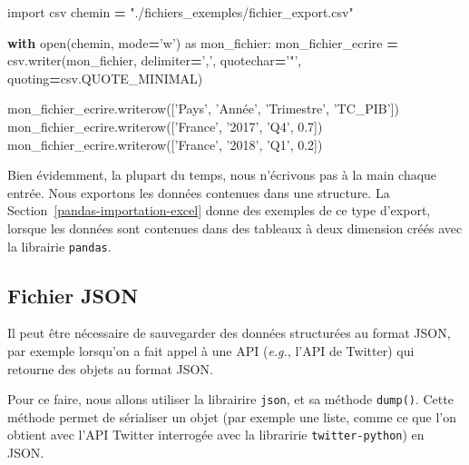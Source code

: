\documentclass[12pt,]{book}
\newenvironment{Shaded}{\begin{snugshade}}{\end{snugshade}}
\newcommand{\FloatTok}[1]{\textcolor[rgb]{0.00,0.00,0.81}{#1}}
\newcommand{\StringTok}[1]{\textcolor[rgb]{0.31,0.60,0.02}{#1}}
\newcommand{\ImportTok}[1]{#1}
\newcommand{\ControlFlowTok}[1]{\textcolor[rgb]{0.13,0.29,0.53}{\textbf{#1}}}
\newcommand{\OperatorTok}[1]{\textcolor[rgb]{0.81,0.36,0.00}{\textbf{#1}}}
\newcommand{\BuiltInTok}[1]{#1}
\newcommand{\NormalTok}[1]{#1}
\numberwithin{equation}{section}
\numberwithin{countremarque}{section}
\begin{document}
\begin{Shaded}
\begin{Highlighting}[]
\ImportTok{import}\NormalTok{ csv}
\NormalTok{chemin }\OperatorTok{=} \StringTok{"./fichiers_exemples/fichier_export.csv"}

\ControlFlowTok{with} \BuiltInTok{open}\NormalTok{(chemin, mode}\OperatorTok{=}\StringTok{'w'}\NormalTok{) }\ImportTok{as}\NormalTok{ mon_fichier:}
\NormalTok{    mon_fichier_ecrire }\OperatorTok{=}\NormalTok{ csv.writer(mon_fichier, delimiter}\OperatorTok{=}\StringTok{','}\NormalTok{,}
\NormalTok{                                    quotechar}\OperatorTok{=}\StringTok{'"'}\NormalTok{,}
\NormalTok{                                    quoting}\OperatorTok{=}\NormalTok{csv.QUOTE_MINIMAL)}

\NormalTok{    mon_fichier_ecrire.writerow([}\StringTok{'Pays'}\NormalTok{, }\StringTok{'Année'}\NormalTok{, }\StringTok{'Trimestre'}\NormalTok{, }\StringTok{'TC_PIB'}\NormalTok{])}
\NormalTok{    mon_fichier_ecrire.writerow([}\StringTok{'France'}\NormalTok{, }\StringTok{'2017'}\NormalTok{, }\StringTok{'Q4'}\NormalTok{, }\FloatTok{0.7}\NormalTok{])}
\NormalTok{    mon_fichier_ecrire.writerow([}\StringTok{'France'}\NormalTok{, }\StringTok{'2018'}\NormalTok{, }\StringTok{'Q1'}\NormalTok{, }\FloatTok{0.2}\NormalTok{])}
\end{Highlighting}
\end{Shaded}

Bien évidemment, la plupart du temps, nous n'écrivons pas à la main
chaque entrée. Nous exportons les données contenues dans une structure.
La Section~\ref{pandas-importation-excel} donne des exemples de ce type
d'export, lorsque les données sont contenues dans des tableaux à deux
dimension créés avec la librairie \texttt{pandas}.

\subsection{Fichier JSON}\label{fichier-json-1}

Il peut être nécessaire de sauvegarder des données structurées au format
JSON, par exemple lorsqu'on a fait appel à une API (\emph{e.g.}, l'API
de Twitter) qui retourne des objets au format JSON.

Pour ce faire, nous allons utiliser la librairire \texttt{json}, et sa
méthode \texttt{dump()}. Cette méthode permet de sérialiser un objet
(par exemple une liste, comme ce que l'on obtient avec l'API Twitter
interrogée avec la libraririe \texttt{twitter-python}) en JSON.
\end{document}
